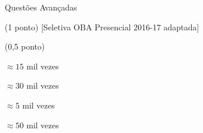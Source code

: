 \documentclass{../lista}
\begin{document}
\begin{secao}{Questões Avançadas}
\begin{questao}{(1 ponto) [Seletiva OBA Presencial 2016-17 adaptada]}
\begin{pergunta}{(0,5 ponto)}
				\begin{alternativas}
					\alternativaMarcada $\approx 15$ mil vezes
					\item $\approx 30$ mil vezes
					\item $\approx 5$ mil vezes
					\item $\approx 50$ mil vezes
				\end{alternativas}
			\end{pergunta}
		\end{questao}
	\end{secao}
\end{document}
